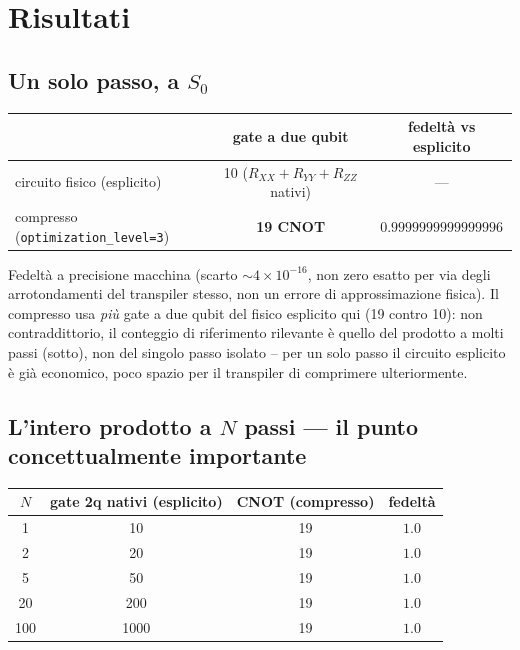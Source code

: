 \documentclass[11pt,a4paper]{article}
\begin{document}
\section{Risultati}

\subsection*{Un solo passo, a $S_0$}

\begin{center}
\renewcommand{\arraystretch}{1.3}
\begin{tabular}{lcc}
\toprule
& gate a due qubit & fedeltà vs esplicito \\
\midrule
circuito fisico (esplicito) & 10 ($R_{XX}{+}R_{YY}{+}R_{ZZ}$ nativi) & --- \\
compresso (\texttt{optimization\_level=3}) & \textbf{19 CNOT} & $0.9999999999999996$ \\
\bottomrule
\end{tabular}
\end{center}

Fedeltà a precisione macchina (scarto $\sim4\times10^{-16}$, non zero
esatto per via degli arrotondamenti del transpiler stesso, non un errore
di approssimazione fisica). Il compresso usa \emph{più} gate a due qubit
del fisico esplicito qui (19 contro 10): non contraddittorio, il conteggio
di riferimento rilevante è quello del prodotto a molti passi (sotto), non
del singolo passo isolato -- per un solo passo il circuito esplicito è già
economico, poco spazio per il transpiler di comprimere ulteriormente.

\subsection*{L'intero prodotto a $N$ passi --- il punto concettualmente importante}

\begin{center}
\renewcommand{\arraystretch}{1.3}
\begin{tabular}{cccc}
\toprule
\rowcolor{inkblue!10}
$N$ & gate 2q nativi (esplicito) & CNOT (compresso) & fedeltà \\
\midrule
1   & 10   & 19 & $1.0$ \\
2   & 20   & 19 & $1.0$ \\
5   & 50   & 19 & $1.0$ \\
20  & 200  & 19 & $1.0$ \\
100 & 1000 & 19 & $1.0$ \\
\bottomrule
\end{tabular}
\end{center}
\end{document}
